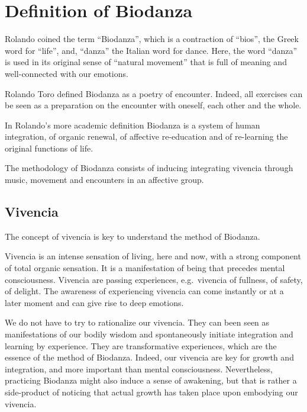 \documentclass[
  11pt,
]{book}
\begin{document}
\hypertarget{definition-of-biodanza}{%
\section{Definition of Biodanza}\label{definition-of-biodanza}}

Rolando coined the term ``Biodanza'', which is a contraction of ``bios'', the Greek word for ``life'', and, ``danza'' the Italian word for dance. Here, the word ``danza'' is used in its original sense of ``natural movement'' that is full of meaning and well-connected with our emotions.

Rolando Toro defined Biodanza as a poetry of encounter. Indeed, all exercises can be seen as a preparation on the encounter with oneself, each other and the whole.

In Rolando's more academic definition Biodanza is a system of human integration, of organic renewal, of affective re-education and of re-learning the original functions of life.

The methodology of Biodanza consists of inducing integrating vivencia through music, movement and encounters in an affective group.

\hypertarget{vivencia}{%
\subsection{Vivencia}\label{vivencia}}

The concept of vivencia is key to understand the method of Biodanza.

Vivencia is an intense sensation of living, here and now, with a strong component of total organic sensation. It is a manifestation of being that precedes mental consciousness. Vivencia are passing experiences, e.g.~vivencia of fullness, of safety, of delight. The awareness of experiencing vivencia can come instantly or at a later moment and can give rise to deep emotions.

We do not have to try to rationalize our vivencia. They can been seen as manifestations of our bodily wisdom and spontaneously initiate integration and learning by experience. They are transformative experiences, which are the essence of the method of Biodanza. Indeed, our vivencia are key for growth and integration, and more important than mental consciousness. Nevertheless, practicing Biodanza might also induce a sense of awakening, but that is rather a side-product of noticing that actual growth has taken place upon embodying our vivencia.
\end{document}
